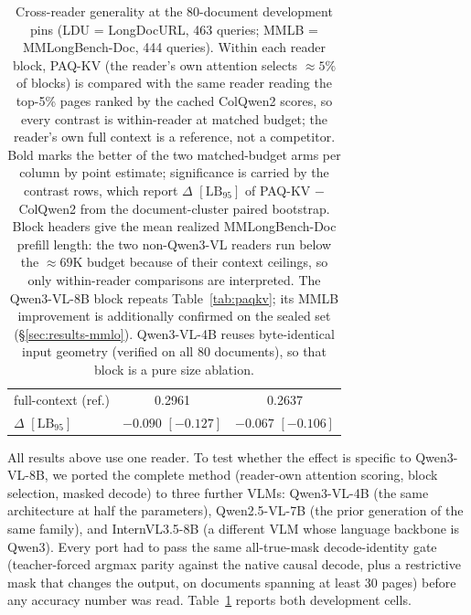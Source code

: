 \documentclass[letterpaper]{article} %
\newcommand{\paqc}{\textsc{PAQ-KV}}
\newcommand{\lb}{\mathrm{LB}_{95}}
\begin{document}
\begin{table}[t]
\begin{tabular}{lcc}
full-context (ref.) & 0.2961 & 0.2637 \\
$\Delta$ $[\lb]$ & $-0.090$ $[-0.127]$ & $-0.067$ $[-0.106]$ \\
\bottomrule
\end{tabular}
\caption{Cross-reader generality at the 80-document development pins (LDU = LongDocURL, 463 queries; MMLB = MMLongBench-Doc, 444 queries). Within each reader block, \paqc{} (the reader's own attention selects ${\approx}5\%$ of blocks) is compared with the same reader reading the top-5\% pages ranked by the cached ColQwen2 scores, so every contrast is within-reader at matched budget; the reader's own full context is a reference, not a competitor. Bold marks the better of the two matched-budget arms per column by point estimate; significance is carried by the contrast rows, which report $\Delta$ $[\lb]$ of \paqc{} $-$ ColQwen2 from the document-cluster paired bootstrap. Block headers give the mean realized MMLongBench-Doc prefill length: the two non-Qwen3-VL readers run below the ${\approx}69$K budget because of their context ceilings, so only within-reader comparisons are interpreted. The Qwen3-VL-8B block repeats Table~\ref{tab:paqkv}; its MMLB improvement is additionally confirmed on the sealed set (\S\ref{sec:results-mmlo}). Qwen3-VL-4B reuses byte-identical input geometry (verified on all 80 documents), so that block is a pure size ablation.}
\label{tab:crossreader}
\end{table}

All results above use one reader. To test whether the effect is specific to Qwen3-VL-8B, we ported the complete method (reader-own attention scoring, block selection, masked decode) to three further VLMs: Qwen3-VL-4B (the same architecture at half the parameters), Qwen2.5-VL-7B \citep{bai2025qwen25vl} (the prior generation of the same family), and InternVL3.5-8B \citep{wang2025internvl35} (a different VLM whose language backbone is Qwen3). Every port had to pass the same all-true-mask decode-identity gate (teacher-forced argmax parity against the native causal decode, plus a restrictive mask that changes the output, on documents spanning at least 30 pages) before any accuracy number was read. Table~\ref{tab:crossreader} reports both development cells.
\end{document}

